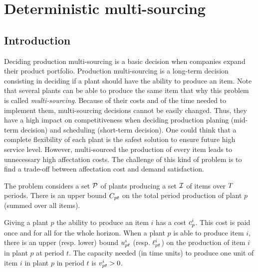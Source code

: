 \chapter{Deterministic multi-sourcing}

\section{Introduction}



Deciding production multi-sourcing is a basic decision when companies expand their product portfolio.
Production multi-sourcing is a long-term decision consisting in deciding if a plant should have the ability to produce an item.
Note that several plants can be able to produce the same item that why this problem is called \emph{multi-sourcing}.
Because of their costs and of the time needed to implement them, multi-sourcing decisions cannot be easily changed.
Thus, they have a high impact on competitiveness when deciding production planing (mid-term decision) and scheduling (short-term decision).
One could think that a complete flexibility of each plant is the safest solution to ensure future high service level.
However, multi-sourced the production of every item leads to unnecessary high affectation costs.
The challenge of this kind of problem is to find a trade-off between affectation cost and demand satisfaction.


\medskip

The problem considers a set $\mathcal{P}$ of plants producing a set $\mathcal{I}$ of items over $T$ periods.
There is an upper bound $C_{pt}$ on the total period production of plant $p$ (summed over all items).

Giving a plant $p$ the ability to produce an item $i$ has a cost $c_p^i$.
This cost is paid once and for all for the whole horizon.
When a plant $p$ is able to produce item $i$, there is an upper (resp. lower) bound $u_{pt}^i$ (resp. $\ell_{pt}^i$) on the production of item $i$ in plant $p$ at period $t$.
The capacity needed (in time units) to produce one unit of item $i$ in plant $p$ in period $t$ is $v_{pt}^i>0$.


